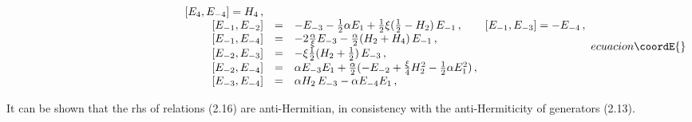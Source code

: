 \documentclass[a4paper,12pt,showkeys]{article}
\begin{document}
\begin{equation}
{\begin{array}{rrl}
\qquad\quad\qquad\qquad \qquad\qquad\qquad \qquad [ E_4 , E_{-4} ] = H_4 \, ,
\cr [ E_{-1} ,E_{-2} ]& =& - E_{-3} - \frac{1}{2} \alpha E_1 +
    \frac{1}{2} \xi (\frac{1}{2} - H_2 )\, E_{-1} \, ,
\qquad
 [ E_{-1} , E_{-3} ] =  - E_{-4} \, ,
\cr [ E_{-1} , E_{-4} ]& =& -2\frac{\alpha}{\xi} E_{-3}
    - \frac{\alpha}{2}(H_2 + H_4)\, E_{-1} \, ,
\cr
 [ E_{-2} , E_{-3} ] &=& - \xi \frac{1}{2}(H_2 + \frac{1}{2})\, E_{-3} \, ,
\cr [ E_{-2} , E_{-4} ]& =&  \alpha E_{-3} E_1 + \frac{\alpha}{2}
    (-E_{-2} + \frac{\xi}{4}H^2_2 -\frac{1}{2}\alpha E^2_1) \, ,
\cr [ E_{-3} , E_{-4} ]& =&  \alpha H_2 \, E_{-3} - \alpha E_{-4} E_1 \, ,
\end{array}
}{ecuacion}\coordE{}\end{equation}

It can be shown that the rhs of relations (2.16) are
anti-Hermitian, in consistency with the anti-Hermiticity of
generators (2.13).
\end{document}
